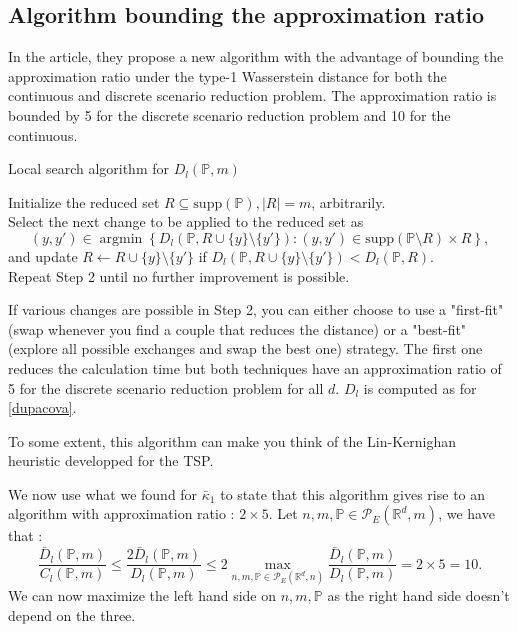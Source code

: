 \documentclass{amsart}
\newcommand{\argmin}{\mathop{\arg\min}}
\newcommand{\RR}{\mathbb{R}}
\begin{document}
\subsection{Algorithm bounding the approximation ratio}
In the article, they propose a new algorithm with the advantage of bounding the approximation ratio under the type-1 Wasserstein distance for both the continuous and discrete scenario reduction problem. The approximation ratio is bounded by 5 for the discrete scenario reduction problem and 10 for the continuous.
\begin{algorithm}
    \caption{Local search algorithm for $D_l\left(\mathbb{P},m\right)$}\label{Local search}
    Initialize the reduced set $R\subseteq \text{supp}\left(\mathbb{P}\right), \lvert R\rvert = m$, arbitrarily. \\ Select the next change to be applied to the reduced set as 
    $$
    \left(y,y'\right)\in\argmin\left\{D_l\left(\mathbb{P},R\cup\{y\}\setminus \{y'\}\right) : \left(y,y'\right)\in\text{supp}\left(\mathbb{P}\setminus R\right)\times R\right\},
    $$
    and update $R\gets R\cup \{y\}\setminus \{y'\}$ if $D_l\left(\mathbb{P}, R\cup\{y\}\setminus \{y'\} \right)<D_l\left(\mathbb{P},R\right).$ \\ Repeat Step 2 until no further improvement is possible.
\end{algorithm}
If various changes are possible in Step 2, you can either choose to use a "first-fit" (swap whenever you find a couple that reduces the distance) or a "best-fit" (explore all possible exchanges and swap the best one) strategy. The first one reduces the calculation time but both techniques have an approximation ratio of 5 for the discrete scenario reduction problem for all $d$. $D_l$ is computed as for \ref{dupacova}.
\begin{remark}
    To some extent, this algorithm can make you think of the Lin-Kernighan heuristic developped for the TSP.
\end{remark}
We now use what we found for $\bar\kappa_1$ to state that this algorithm gives rise to an algorithm with approximation ratio : $2\times 5$. Let $n,m,\mathbb{P}\in\mathcal{P}_E\left(\RR^d,m\right)$, we have that : 
$$
\frac{\bar{D}_l\left(\mathbb{P},m\right)}{C_l\left(\mathbb{P},m\right)}\leq \frac{2\bar{D}_l\left(\mathbb{P},m\right)}{D_l\left(\mathbb{P},m\right)}\leq 2\max_{n,m,\mathbb{P}\in\mathcal{P}_E(\RR^d,n)}\frac{\bar{D}_l\left(\mathbb{P},m\right)}{D_l\left(\mathbb{P},m\right)}=2\times5=10.
$$
We can now maximize the left hand side on $n,m,\mathbb{P}$ as the right hand side doesn't depend on the three.
\end{document}
